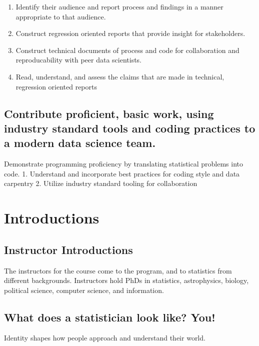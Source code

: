 \documentclass[
  letterpaper,
  DIV=11,
  numbers=noendperiod]{scrreprt}
\providecommand{\tightlist}{%
  \setlength{\itemsep}{0pt}\setlength{\parskip}{0pt}}\usepackage{longtable,booktabs,array}
\begin{document}
\begin{enumerate}
\def\labelenumi{\arabic{enumi}.}
\tightlist
\item
  Identify their audience and report process and findings in a manner
  appropriate to that audience.
\item
  Construct regression oriented reports that provide insight for
  stakeholders.
\item
  Construct technical documents of process and code for collaboration
  and reproducability with peer data scientists.
\item
  Read, understand, and assess the claims that are made in technical,
  regression oriented reports
\end{enumerate}

\subsection{Contribute proficient, basic work, using industry standard
tools and coding practices to a modern data science
team.}\label{contribute-proficient-basic-work-using-industry-standard-tools-and-coding-practices-to-a-modern-data-science-team.}

Demonstrate programming proficiency by translating statistical problems
into code. 1. Understand and incorporate best practices for coding style
and data carpentry 2. Utilize industry standard tooling for
collaboration

\section{Introductions}\label{introductions}

\subsection{Instructor Introductions}\label{instructor-introductions}

The instructors for the course come to the program, and to statistics
from different backgrounds. Instructors hold PhDs in statistics,
astrophysics, biology, political science, computer science, and
information.

\subsection{What does a statistician look like?
You!}\label{what-does-a-statistician-look-like-you}

Identity shapes how people approach and understand their world.
\end{document}
